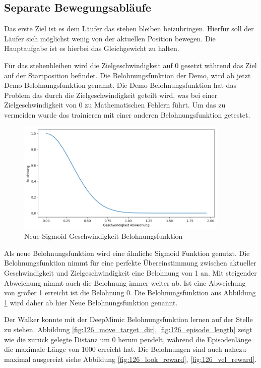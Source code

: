 \subsection{Separate Bewegungsabläufe}

Das erste Ziel ist es dem Läufer das stehen bleiben beizubringen. Hierfür soll der Läufer sich möglichst wenig von der aktuellen Position bewegen. Die Hauptaufgabe ist es hierbei das Gleichgewicht zu halten. 

Für das stehenbleiben wird die Zielgeschwindigkeit auf 0 gesetzt während das Ziel auf der Startposition befindet. Die Belohnungsfunktion der Demo, wird ab jetzt Demo Belohnungsfunktion genannt. Die Demo Belohnungsfunktion hat das Problem das durch die Zielgeschwindigkeit geteilt wird, was bei einer Zielgeschwindigkeit von 0 zu Mathematischen Fehlern führt. Um das zu vermeiden wurde das trainieren mit einer anderen Belohnungsfunktion getestet.

\begin{figure}[H]
  \centering  
  \includegraphics[width=0.9\textwidth]{img/plot_vel_reward_neu}
  \caption{Neue Sigmoid Geschwindigkeit Belohnungsfunktion}
  \label{fig:plot_vel_reward_neu}
\end{figure}

Als neue Belohnungsfunktion wird eine ähnliche Sigmoid Funktion genutzt. Die Belohnungsfunktion nimmt für eine perfekte Übereinstimmung zwischen aktueller Geschwindigkeit und Zielgeschwindigkeit eine Belohnung von 1 an. Mit steigender Abweichung nimmt auch die Belohnung immer weiter ab. Ist eine Abweichung von größer 1 erreicht ist die Belohnung 0. Die Belohnungsfunktion aus Abbildung \ref{fig:plot_vel_reward_neu} wird daher ab hier Neue Belohnungsfunktion genannt.

Der Walker konnte mit der DeepMimic Belohnungsfunktion lernen auf der Stelle zu stehen.  Abbildung \ref{fig:126_move_target_dir}, \ref{fig:126_episode_length} zeigt wie die zurück gelegte Distanz um 0 herum pendelt, während die Episodenlänge die maximale Länge von 1000 erreicht hat. Die Belohnungen sind auch nahezu maximal ausgereizt siehe Abbildung \ref{fig:126_look_reward}, \ref{fig:126_vel_reward}.

